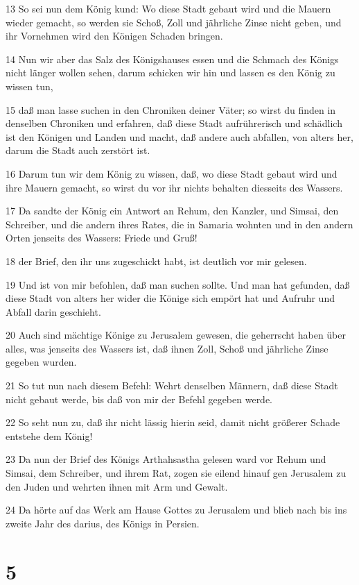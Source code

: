 \par 13 So sei nun dem König kund: Wo diese Stadt gebaut wird und die Mauern wieder gemacht, so werden sie Schoß, Zoll und jährliche Zinse nicht geben, und ihr Vornehmen wird den Königen Schaden bringen.
\par 14 Nun wir aber das Salz des Königshauses essen und die Schmach des Königs nicht länger wollen sehen, darum schicken wir hin und lassen es den König zu wissen tun,
\par 15 daß man lasse suchen in den Chroniken deiner Väter; so wirst du finden in denselben Chroniken und erfahren, daß diese Stadt aufrührerisch und schädlich ist den Königen und Landen und macht, daß andere auch abfallen, von alters her, darum die Stadt auch zerstört ist.
\par 16 Darum tun wir dem König zu wissen, daß, wo diese Stadt gebaut wird und ihre Mauern gemacht, so wirst du vor ihr nichts behalten diesseits des Wassers.
\par 17 Da sandte der König ein Antwort an Rehum, den Kanzler, und Simsai, den Schreiber, und die andern ihres Rates, die in Samaria wohnten und in den andern Orten jenseits des Wassers: Friede und Gruß!
\par 18 der Brief, den ihr uns zugeschickt habt, ist deutlich vor mir gelesen.
\par 19 Und ist von mir befohlen, daß man suchen sollte. Und man hat gefunden, daß diese Stadt von alters her wider die Könige sich empört hat und Aufruhr und Abfall darin geschieht.
\par 20 Auch sind mächtige Könige zu Jerusalem gewesen, die geherrscht haben über alles, was jenseits des Wassers ist, daß ihnen Zoll, Schoß und jährliche Zinse gegeben wurden.
\par 21 So tut nun nach diesem Befehl: Wehrt denselben Männern, daß diese Stadt nicht gebaut werde, bis daß von mir der Befehl gegeben werde.
\par 22 So seht nun zu, daß ihr nicht lässig hierin seid, damit nicht größerer Schade entstehe dem König!
\par 23 Da nun der Brief des Königs Arthahsastha gelesen ward vor Rehum und Simsai, dem Schreiber, und ihrem Rat, zogen sie eilend hinauf gen Jerusalem zu den Juden und wehrten ihnen mit Arm und Gewalt.
\par 24 Da hörte auf das Werk am Hause Gottes zu Jerusalem und blieb nach bis ins zweite Jahr des darius, des Königs in Persien.

\chapter{5}

